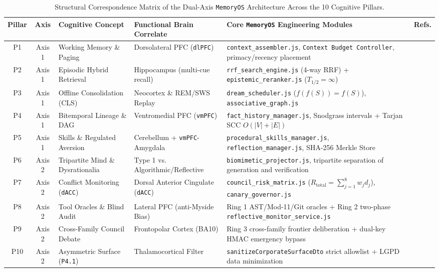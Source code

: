 \documentclass[10pt,twocolumn]{article}
\begin{document}
\begin{table}[t]
\centering
\caption{Structural Correspondence Matrix of the Dual-Axis \texttt{MemoryOS} Architecture Across the 10 Cognitive Pillars.}
\label{tab:pillars}
\footnotesize
\begin{tabularx}{\textwidth}{@{}c c l l X c@{}}
\toprule
\textbf{Pillar} & \textbf{Axis} & \textbf{Cognitive Concept} & \textbf{Functional Brain Correlate} & \textbf{Core \texttt{MemoryOS} Engineering Modules} & \textbf{Refs.} \\
\midrule
P1 & Axis 1 & Working Memory \& Paging & Dorsolateral PFC (\texttt{dlPFC}) & \texttt{context\_assembler.js}, \texttt{Context Budget Controller}, primacy/recency placement & \cite{E01,E02,E03,E04} \\
P2 & Axis 1 & Episodic Hybrid Retrieval & Hippocampus (multi-cue recall) & \texttt{rrf\_search\_engine.js} (4-way RRF) + \texttt{epistemic\_reranker.js} ($T_{1/2}=\infty$) & \cite{E05,E06,E07,E08} \\
P3 & Axis 1 & Offline Consolidation (CLS) & Neocortex \& REM/SWS Replay & \texttt{dream\_scheduler.js} ($f(f(S))=f(S)$), \texttt{associative\_graph.js} & \cite{E09,E10,E11} \\
P4 & Axis 1 & Bitemporal Lineage \& DAG & Ventromedial PFC (\texttt{vmPFC}) & \texttt{fact\_history\_manager.js}, Snodgrass intervals + Tarjan SCC $O(|V|+|E|)$ & \cite{E12,E13,E14} \\
P5 & Axis 1 & Skills \& Regulated Aversion & Cerebellum + \texttt{vmPFC}-Amygdala & \texttt{procedural\_skills\_manager.js}, \texttt{reflection\_manager.js}, SHA-256 Merkle Store & \cite{E15,E16,E17,E18,E19} \\
P6 & Axis 2 & Tripartite Mind \& Dysrationalia & Type 1 vs. Algorithmic/Reflective & \texttt{biomimetic\_projector.js}, tripartite separation of generation and verification & \cite{E20,E21,E22,E23,E24} \\
P7 & Axis 2 & Conflict Monitoring (\texttt{dACC}) & Dorsal Anterior Cingulate (\texttt{dACC}) & \texttt{council\_risk\_matrix.js} ($R_{\mathrm{total}} = \sum_{j=1}^8 w_j d_j$), \texttt{canary\_governor.js} & \cite{E25,E26,E27} \\
P8 & Axis 2 & Tool Oracles \& Blind Audit & Lateral PFC (anti-Myside Bias) & Ring 1 AST/Mod-11/Git oracles + Ring 2 two-phase \texttt{reflective\_monitor\_service.js} & \cite{E28,E29,E30} \\
P9 & Axis 2 & Cross-Family Council Debate & Frontopolar Cortex (BA10) & Ring 3 cross-family frontier deliberation + dual-key HMAC emergency bypass & \cite{E31,E32} \\
P10 & Axis 2 & Asymmetric Surface (\texttt{P4.1}) & Thalamocortical Filter & \texttt{sanitizeCorporateSurfaceDto} strict allowlist + LGPD data minimization & \cite{E21,N01} \\
\bottomrule
\end{tabularx}
\end{table}
\end{document}
